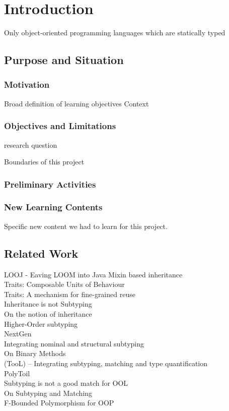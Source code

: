 \chapter{Introduction}
Only object-oriented programming languages which are statically typed

\section{Purpose and Situation}
\subsection{Motivation}
Broad definition of learning objectives
Context

\subsection{Objectives and Limitations}
research question

Boundaries of this project

\subsection{Preliminary Activities}

\subsection{New Learning Contents}
Specific new content we had to learn for this project.

\section{Related Work}
\cite{bruce_looj:_2004} LOOJ - Eaving LOOM into Java
\cite{bracha_mixin-based_1990} Mixin based inheritance \\
\cite{schaerli_traits:_2003} Traits: Composable Units of Behaviour \\
\cite{ducasse_traits:_2006} Traits: A mechanism for fine-grained reuse \\
\cite{cook_inheritance_1990} Inheritance is not Subtyping \\
\cite{taivalsaari_notion_1996} On the notion of inheritance \\
\cite{steffen_higher-order_1994} Higher-Order subtyping \\
\cite{cartwright_compatible_1998} NextGen \\
\cite{malayeri_integrating_2008} Integrating nominal and structural subtyping \\
\cite{bruce_binary_1995} On Binary Methods \\
\cite{gawecki_tool:_1995}  (TooL) -- Integrating subtyping, matching and type quantification \\
\cite{bruce_polytoil:_1995} PolyToil \\
\cite{bruce_subtyping_1997} Subtyping is not a good match for OOL \\
\cite{abadi_subtyping_1996} On Subtyping and Matching \\
\cite{canning_f-bounded_1989} F-Bounded Polymorphism for OOP

